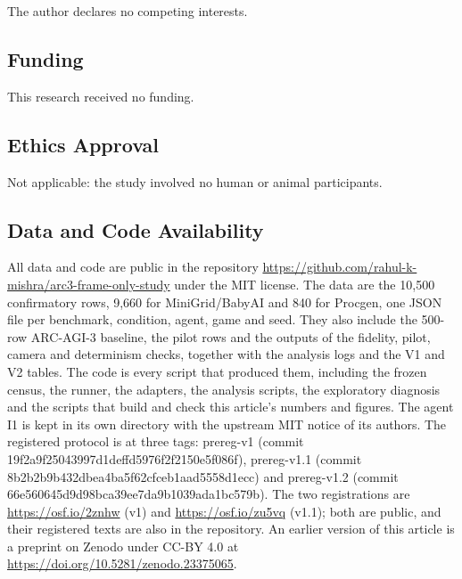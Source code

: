 \documentclass[twocolumn]{svjour3}
\begin{document}
The author declares no competing interests.

\subsection*{Funding}\label{funding}

This research received no funding.

\subsection*{Ethics Approval}\label{ethics-approval}

Not applicable: the study involved no human or animal participants.

\subsection*{Data and Code
Availability}\label{data-and-code-availability}

All data and code are public in the repository
\url{https://github.com/rahul-k-mishra/arc3-frame-only-study} under the
MIT license. The data are the 10,500 confirmatory rows, 9,660 for
MiniGrid/BabyAI and 840 for Procgen, one JSON file per benchmark,
condition, agent, game and seed. They also include the 500-row ARC-AGI-3
baseline, the pilot rows and the outputs of the fidelity, pilot, camera
and determinism checks, together with the analysis logs and the V1 and
V2 tables. The code is every script that produced them, including the
frozen census, the runner, the adapters, the analysis scripts, the
exploratory diagnosis and the scripts that build and check this
article's numbers and figures. The agent I1 is kept in its own directory
with the upstream MIT notice of its authors. The registered protocol is
at three tags: prereg-v1 (commit
19f2a9f2\allowbreak{}5043997d\allowbreak{}1deffd59\allowbreak{}76f2f215\allowbreak{}0e5f086f),
prereg-v1.1 (commit
8b2b2b9b\allowbreak{}432dbea4\allowbreak{}ba5f62cf\allowbreak{}ceb1aad5\allowbreak{}558d1ecc)
and prereg-v1.2 (commit
66e56064\allowbreak{}5d9d98bc\allowbreak{}a39ee7da\allowbreak{}9b1039ad\allowbreak{}a1bc579b).
The two registrations are \url{https://osf.io/2znhw} (v1) and
\url{https://osf.io/zu5vq} (v1.1); both are public, and their registered
texts are also in the repository. An earlier version of this article is
a preprint on Zenodo under CC-BY 4.0 at
\url{https://doi.org/10.5281/zenodo.23375065}.



\end{document}
